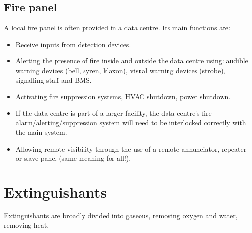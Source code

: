 \documentclass{pgnotes}
\begin{document}
\subsection{Fire panel}
\label{sec:fire-panel}

A local fire panel is often provided in a data centre. Its main
functions are:

\begin{itemize}
\item
  Receive inputs from detection devices.
\item
  Alerting the presence of fire inside and outside the data centre
  using: audible warning devices (bell, syren, klaxon), visual warning
  devices (strobe), signalling staff and BMS.
\item
  Activating fire suppression systems, HVAC shutdown, power shutdown.
\item
  If the data centre is part of a larger facility, the data centre's
  fire alarm/alerting/suppression system will need to be interlocked
  correctly with the main system.
\item
  Allowing remote visibility through the use of a remote annunciator,
  repeater or slave panel (same meaning for all!).
\end{itemize}

\section{Extinguishants}
\label{sec:extinguishants}

Extinguishants are broadly divided into gaseous, removing oxygen and
water, removing heat.
\end{document}

